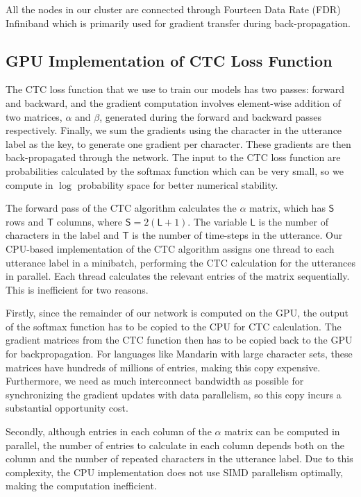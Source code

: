\documentclass{article}
\begin{document}
All the nodes in our cluster are connected through Fourteen Data Rate (FDR) Infiniband which is primarily used for gradient transfer during back-propagation.

\subsection{GPU Implementation of CTC Loss Function}
\label{appendix:GPUCTC}

The CTC loss function that we use to train our models has two passes: forward and backward, and the gradient computation involves element-wise addition of two matrices, $\alpha$ and $\beta$, generated during the forward and backward passes respectively. Finally, we sum the gradients using the character in the utterance label as the key, to generate one gradient per character. These gradients are then back-propagated through the network. The input to the CTC loss function are probabilities calculated by the softmax function which can be very small, so we compute in $\log$ probability space for better numerical stability.

The forward pass of the CTC algorithm calculates the $\alpha$ matrix, which has $\mathsf{S}$ rows and $\mathsf{T}$ columns, where $\mathsf{S} = 2 (\mathsf{L} + 1)$. The variable $\mathsf{L}$ is the number of characters in the label and $\mathsf{T}$ is the number of time-steps in the utterance. Our CPU-based implementation of the CTC algorithm assigns one thread to each utterance label in a minibatch, performing the CTC calculation for the utterances in parallel. Each thread calculates the relevant entries of the matrix sequentially. This is inefficient for two reasons. 

Firstly, since the remainder of our network is computed on the GPU, the output of the softmax function has to be copied to the CPU for CTC calculation. The gradient matrices from the CTC function then has to be copied back to the GPU for backpropagation. For languages like Mandarin with large character sets, these matrices have hundreds of millions of entries, making this copy expensive. Furthermore, we need as much interconnect bandwidth as possible for synchronizing the gradient updates with data parallelism, so this copy incurs a substantial opportunity cost.

Secondly, although entries in each column of the $\alpha$ matrix can be computed in parallel, the number of entries to calculate in each column depends both on the column and the number of repeated characters in the utterance label. Due to this complexity, the CPU implementation does not use SIMD parallelism optimally, making the computation inefficient.
\end{document}
